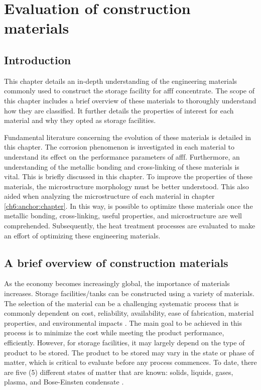 \chapter{Evaluation of construction materials}
\section{Introduction}
This chapter details an in-depth understanding of the engineering materials commonly used to construct the storage facility for \acrshort{afff} concentrate. The scope of this chapter includes a brief overview of these materials to thoroughly understand how they are classified. It further details the properties of interest for each material and why they opted as storage facilities.

Fundamental literature concerning the evolution of these materials is detailed in this chapter. The corrosion phenomenon is investigated in each material to understand its effect on the performance parameters of \acrshort{afff}. Furthermore, an understanding of the metallic bonding and cross-linking of these materials is vital. This is briefly discussed in this chapter. To improve the properties of these materials, the microstructure morphology must be better understood. This also aided when analyzing the microstructure of each material in chapter \ref{ch6:anchor:chapter}. In this way, is possible to optimize these materials once the metallic bonding, cross-linking, useful properties, and microstructure are well comprehended. Subsequently, the heat treatment processes are evaluated to make an effort of optimizing these engineering materials.

\section{A brief overview of construction materials}
As the economy becomes increasingly global, the importance of materials increases. Storage facilities/tanks can be constructed using a variety of materials. The selection of the material can be a challenging systematic process that is commonly dependent on cost, reliability, availability, ease of fabrication, material properties, and environmental impacts \cite{hench2005biomaterials}.  The main goal to be achieved in this process is to minimize the cost while meeting the product performance, efficiently. However, for storage facilities, it may largely depend on the type of product to be stored. The product to be stored may vary in the state or phase of matter, which is critical to evaluate before any process commences. To date, there are five (5) different states of matter that are known: solids, liquids, gases, plasma, and Bose-Einsten condensate \cite{ceruti2002states}.

